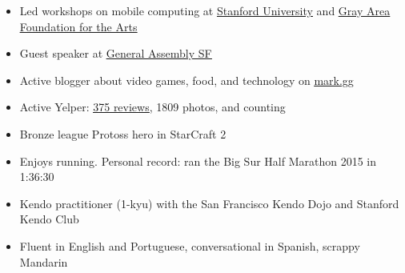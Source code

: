 

\begin{cvparagraph}


\begin{justify}
\begin{itemize}[leftmargin=2ex, nosep]
    \setlength{\parskip}{0pt}
    \setlength\itemsep{0.15em}
    \renewcommand{\labelitemi}{\bullet}
    
    \item Led workshops on mobile computing at \href{https://ccrma.stanford.edu/workshops/music-and-mobile-computing}{\underline{Stanford University}} and \href{http://main.dev.gaffta.org/?author=81}{\underline{Gray Area Foundation for the Arts}}
    \item Guest speaker at \href{https://generalassemb.ly/instructors/mark-cerqueira/10476}{\underline{General Assembly SF}}
	\item Active blogger about video games, food, and technology on \href{mark.gg}{\underline{mark.gg}}
	\item Active Yelper: \href{markcerqueira.yelp.com}{\underline{375 reviews}}, 1809 photos, and counting
	\item Bronze league Protoss hero in StarCraft 2
	\item Enjoys running. Personal record: ran the Big Sur Half Marathon 2015 in 1:36:30
	\item Kendo practitioner (1-kyu) with the San Francisco Kendo Dojo and Stanford Kendo Club
	\item Fluent in English and Portuguese, conversational in Spanish, scrappy Mandarin
	

\end{itemize}
\end{justify}

\end{cvparagraph}